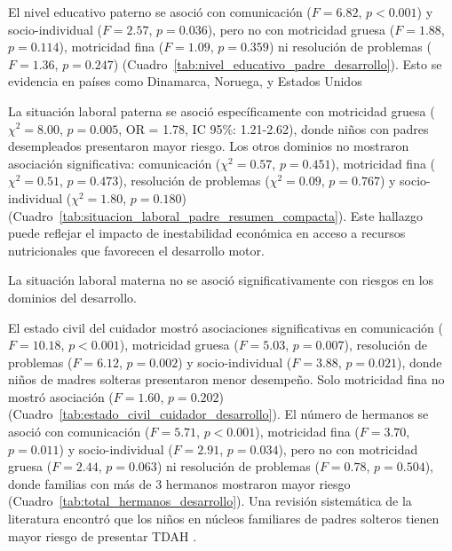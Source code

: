 El nivel educativo 
paterno se asoció con comunicación ($F = 6.82$, $p < 0.001$) y socio-individual 
($F = 2.57$, $p = 0.036$), pero no con motricidad gruesa ($F = 1.88$, 
$p = 0.114$), motricidad fina ($F = 1.09$, $p = 0.359$) ni resolución de 
problemas ($F = 1.36$, $p = 0.247$) 
(Cuadro~\ref{tab:nivel_educativo_padre_desarrollo}). Esto se evidencia en países como Dinamarca, Noruega, y Estados Unidos \cite{Holstein2021,Torvik2020,Sauver2004}

La situación laboral paterna se asoció específicamente con motricidad gruesa 
($\chi^2 = 8.00$, $p = 0.005$, OR = 1.78, IC 95\%: 1.21-2.62), donde niños 
con padres desempleados presentaron mayor riesgo. Los otros dominios no 
mostraron asociación significativa: comunicación ($\chi^2 = 0.57$, $p = 0.451$), 
motricidad fina ($\chi^2 = 0.51$, $p = 0.473$), resolución de problemas 
($\chi^2 = 0.09$, $p = 0.767$) y socio-individual ($\chi^2 = 1.80$, 
$p = 0.180$) (Cuadro~\ref{tab:situacion_laboral_padre_resumen_compacta}). 
Este hallazgo puede reflejar el impacto de inestabilidad económica en 
acceso a recursos nutricionales que favorecen el desarrollo motor.

La situación laboral materna no se asoció significativamente con riesgos en los
dominios del desarrollo.

El estado civil del cuidador mostró asociaciones significativas en comunicación 
($F = 10.18$, $p < 0.001$), motricidad gruesa ($F = 5.03$, $p = 0.007$), 
resolución de problemas ($F = 6.12$, $p = 0.002$) y socio-individual 
($F = 3.88$, $p = 0.021$), donde niños de madres solteras presentaron 
menor desempeño. Solo motricidad fina no mostró asociación ($F = 1.60$, 
$p = 0.202$) (Cuadro~\ref{tab:estado_civil_cuidador_desarrollo}). El número 
de hermanos se asoció con comunicación ($F = 5.71$, $p < 0.001$), motricidad 
fina ($F = 3.70$, $p = 0.011$) y socio-individual ($F = 2.91$, $p = 0.034$), 
pero no con motricidad gruesa ($F = 2.44$, $p = 0.063$) ni resolución de 
problemas ($F = 0.78$, $p = 0.504$), donde familias con más de 3 hermanos 
mostraron mayor riesgo (Cuadro~\ref{tab:total_hermanos_desarrollo}).
Una revisión sistemática de la literatura encontró que los niños en núcleos
familiares de padres solteros tienen mayor riesgo de presentar TDAH
\cite{Claussen2022}.

